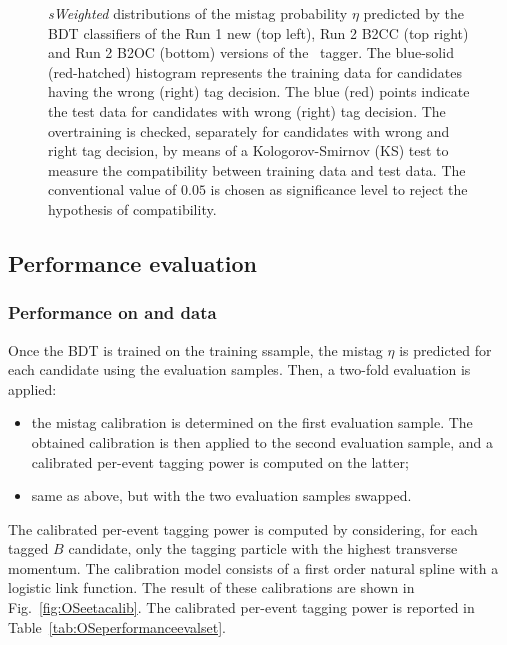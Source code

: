 \begin{figure}[t]
\begin{center}
        \end{center}
        \vspace{-2mm}
        \caption{\emph{sWeighted} distributions of the mistag probability $\eta$ predicted by the BDT classifiers of the Run 1 new (top left), Run 2 B2CC (top right) and Run 2 B2OC (bottom) versions of the \OSe~tagger. 
          The blue-solid (red-hatched) histogram represents the training data for candidates having the wrong (right) tag decision. 
          The blue (red) points indicate the test data for candidates with wrong (right) tag decision. 
          The overtraining is checked, separately for candidates with wrong and right tag decision,
          by means of a Kologorov-Smirnov (KS) test to measure the compatibility between training data and test data.
          The conventional value of $0.05$ is chosen as significance level to reject the hypothesis of compatibility.}
        \label{fig:OSeetapredict}
\end{figure}


\subsection{Performance evaluation}


\subsubsection[Performance on $B^+\to J/\psi K^+$ and $B^+\to D^0 \pi^+$ data]{Performance on  and  data}
\label{sec:tagging:OSePerf1}

Once the BDT is trained on the training ssample, the mistag $\eta$ is predicted for each candidate using the evaluation samples. Then, a two-fold evaluation is applied:
\begin{itemize}[noitemsep,topsep=0pt]
        \item the mistag calibration is determined on the first evaluation sample. The obtained calibration is then applied to the second evaluation sample, and a calibrated per-event tagging power is computed on the latter;
        \item same as above, but with the two evaluation samples swapped.
\end{itemize}
The calibrated per-event tagging power is computed by considering, for each tagged $B$ candidate, only the tagging particle with the highest transverse momentum.
The calibration model consists of a first order natural spline with a logistic link function.
The result of these calibrations are shown in Fig.~\ref{fig:OSeetacalib}.
The calibrated per-event tagging power is reported in Table~\ref{tab:OSeperformanceevalset}.

